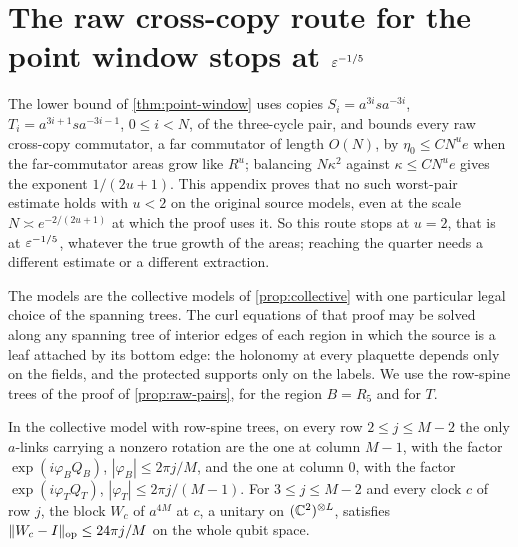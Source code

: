 \section{The raw cross-copy route for the point window stops at \texorpdfstring{$\varepsilon^{-1/5}$}{eps\^{}-1/5}}\label{app:window}

The lower bound of \cref{thm:point-window} uses copies $S_i=a^{3i}sa^{-3i}$, $T_i=a^{3i+1}sa^{-3i-1}$, $0\le i<N$, of the three-cycle
pair, and bounds every raw cross-copy commutator, a far commutator of length $O(N)$, by $\eta_0\le CN^ue$ when the far-commutator
areas grow like $R^u$; balancing $N\kappa^2$ against $\kappa\le CN^ue$ gives the exponent $1/(2u+1)$. This appendix proves that no
such worst-pair estimate holds with $u<2$ on the original source models, even at the scale $N\asymp e^{-2/(2u+1)}$ at which the proof
uses it. So this route stops at $u=2$, that is at $\varepsilon^{-1/5}$, whatever the true growth of the areas; reaching the quarter needs a
different estimate or a different extraction.

The models are the collective models of \cref{prop:collective} with one particular legal choice of the spanning trees. The curl
equations of that proof may be solved along any spanning tree of interior edges of each region in which the source is a leaf
attached by its bottom edge: the holonomy at every plaquette depends only on the fields, and the protected supports only on the
labels. We use the row-spine trees of the proof of \cref{prop:raw-pairs}, for the region $B=R_5$ and for $T$.

\begin{lemma}\label{lem:window-angles}
In the collective model with row-spine trees, on every row $2\le j\le M-2$ the only $a$-links carrying a nonzero rotation are the one
at column $M-1$, with the factor $\exp(i\varphi_BQ_B)$, $|\varphi_B|\le2\pi j/M$, and the one at column $0$, with the factor
$\exp(i\varphi_TQ_T)$, $|\varphi_T|\le2\pi j/(M-1)$. For $3\le j\le M-2$ and every clock $c$ of row $j$, the block $W_c$ of $a^{4M}$ at $c$,
a unitary on $(\mathbb C^2)^{\otimes L}$, satisfies $\lVert W_c-I\rVert_{\mathrm{op}}\le24\pi j/M$ on the whole qubit space.
\end{lemma}

